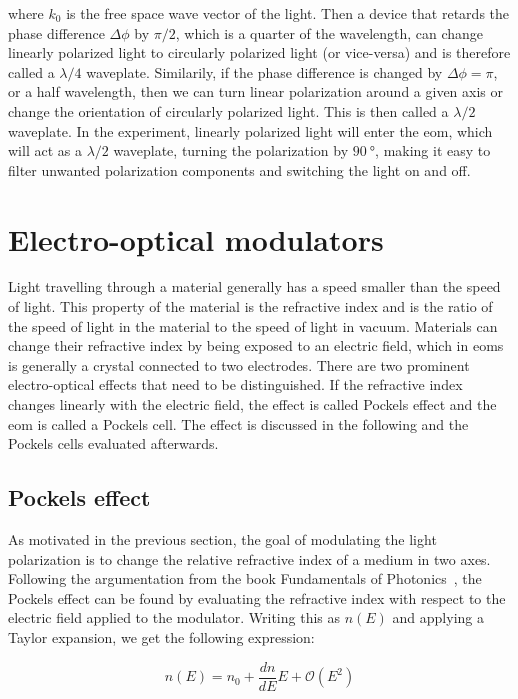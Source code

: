 where $k_0$ is the free space wave vector of the light. Then a device that retards the phase difference $\Delta \phi$ by $\pi/2$, which is a quarter of the wavelength, can change linearly polarized light to circularly polarized light (or vice-versa) and is therefore called a $\lambda / 4$ waveplate. Similarily, if the phase difference is changed by $\Delta \phi = \pi$, or a half wavelength, then we can turn linear polarization around a given axis or change the orientation of circularly polarized light. This is then called a $\lambda / 2$ waveplate. In the experiment, linearly polarized light will enter the \ac{eom}, which will act as a $\lambda / 2$ waveplate, turning the polarization by $\SI{90}{\degree}$, making it easy to filter unwanted polarization components and switching the light on and off.

\section{Electro-optical modulators}%
\label{sec:eom}

Light travelling through a material generally has a speed smaller than the speed of light. This property of the material is the refractive index and is the ratio of the speed of light in the material to the speed of light in vacuum. Materials can change their refractive index by being exposed to an electric field, which in \acp{eom} is generally a crystal connected to two electrodes. There are two prominent electro-optical effects that need to be distinguished. If the refractive index changes linearly with the electric field, the effect is called Pockels effect and the \ac{eom} is called a Pockels cell. The effect is discussed in the following and the Pockels cells evaluated afterwards.

\subsection{Pockels effect}%
\label{sec:Pockels_effect}

As motivated in the previous section, the goal of modulating the light polarization is to change the relative refractive index of a medium in two axes. Following the argumentation from the book Fundamentals of Photonics~\cite{Saleh1991}, the Pockels effect can be found by evaluating the refractive index with respect to the electric field applied to the modulator. Writing this as $n(E)$ and applying a Taylor expansion, we get the following expression:

\begin{equation}
	n(E) = n_0 + \frac{dn}{dE} E + \mathcal{O}(E^2)
\end{equation}

